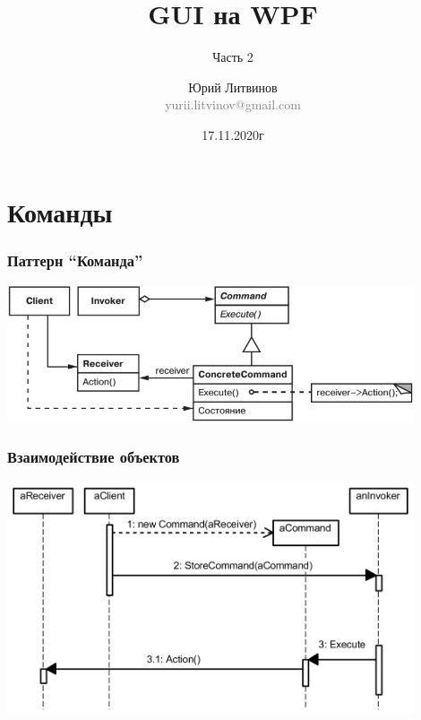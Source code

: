 \documentclass[xetex,mathserif,serif]{beamer}
\title{GUI на WPF}
\subtitle{Часть 2}
\author[Юрий Литвинов]{Юрий Литвинов\\\small{\textcolor{gray}{yurii.litvinov@gmail.com}}}
\date{17.11.2020г}
\begin{document}
	\frame{\titlepage}

	\section{Команды}

	\begin{frame}
		\frametitle{Паттерн ``Команда''}
		\begin{center}
			\includegraphics[width=0.9\textwidth]{command.png}
		\end{center}
	\end{frame}

	\begin{frame}
		\frametitle{Взаимодействие объектов}
		\begin{center}
			\includegraphics[width=0.9\textwidth]{commandSequence.png}
		\end{center}
	\end{frame}
\end{document}
